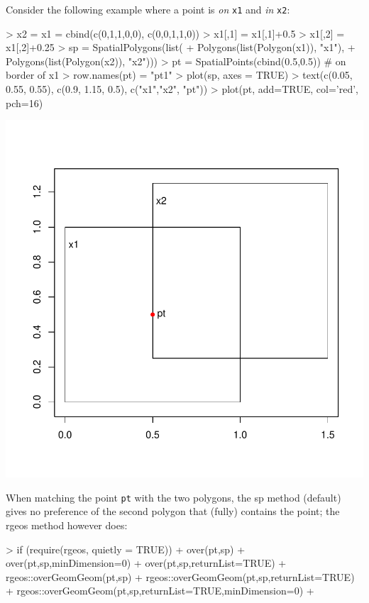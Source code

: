 \documentclass{article}
\newcommand{\code}[1]{{\tt #1}}
\begin{document}
Consider the following example where a point is {\em on} \code{x1} and {\em in} \code{x2}: 
\begin{Schunk}
\begin{Sinput}
> x2 = x1 = cbind(c(0,1,1,0,0), c(0,0,1,1,0))
> x1[,1] = x1[,1]+0.5
> x1[,2] = x1[,2]+0.25
> sp = SpatialPolygons(list(
+  Polygons(list(Polygon(x1)), "x1"),
+  Polygons(list(Polygon(x2)), "x2")))
> pt = SpatialPoints(cbind(0.5,0.5)) # on border of x1
> row.names(pt) = "pt1"
> plot(sp, axes = TRUE)
> text(c(0.05, 0.55, 0.55), c(0.9, 1.15, 0.5), c("x1","x2", "pt"))
> plot(pt, add=TRUE, col='red', pch=16)
\end{Sinput}
\end{Schunk}
\includegraphics{over-025}

When matching the point \code{pt} with the two polygons, the
sp method (default) gives no preference of the second polygon
that (fully) contains the point; the rgeos method however does:
\begin{Schunk}
\begin{Sinput}
> if (require(rgeos, quietly = TRUE)) {
+ over(pt,sp)
+ over(pt,sp,minDimension=0)
+ over(pt,sp,returnList=TRUE)
+ rgeos::overGeomGeom(pt,sp)
+ rgeos::overGeomGeom(pt,sp,returnList=TRUE)
+ rgeos::overGeomGeom(pt,sp,returnList=TRUE,minDimension=0)
+ }
\end{Sinput}
\end{Schunk}
\end{document}
